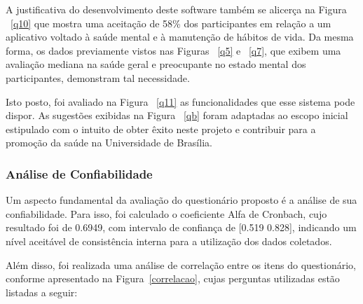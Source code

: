 A justificativa do desenvolvimento deste software também se alicerça na Figura ~\ref{q10} que mostra uma aceitação de 58\% dos participantes em relação a um aplicativo voltado à saúde mental e à manutenção de hábitos de vida. Da mesma forma, os dados previamente vistos nas Figuras ~\ref{q5} e ~\ref{q7}, que exibem uma avaliação mediana na saúde geral e preocupante no estado mental dos participantes, demonstram tal necessidade. 

Isto posto, foi avaliado na Figura ~\ref{q11} as funcionalidades que esse sistema pode dispor. As sugestões exibidas na Figura ~\ref{qb} foram adaptadas ao escopo inicial estipulado com o intuito de obter êxito neste projeto e contribuir para a promoção da saúde na Universidade de Brasília.

\subsubsection{Análise de Confiabilidade}

Um aspecto fundamental da avaliação do questionário proposto é a análise de sua confiabilidade. Para isso, foi calculado o coeficiente Alfa de Cronbach, cujo resultado foi de 0.6949, com intervalo de confiança de [0.519 0.828], indicando um nível aceitável de consistência interna para a utilização dos dados coletados.

Além disso, foi realizada uma análise de correlação entre os itens do questionário, conforme apresentado na Figura~\ref{correlacao}, cujas perguntas utilizadas estão listadas a seguir:

